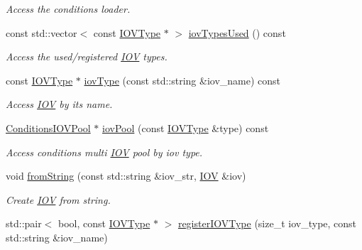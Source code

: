 \begin{DoxyCompactItemize}
\begin{DoxyCompactList}\small\item\em Access the conditions loader. \item\end{DoxyCompactList}\item 
const std::vector$<$ const \hyperlink{class_d_d4hep_1_1_i_o_v_type}{IOVType} $\ast$ $>$ \hyperlink{class_d_d4hep_1_1_conditions_1_1_conditions_manager_a01a57795e2d1ae0fba2f2f6348be5c46}{iovTypesUsed} () const 
\begin{DoxyCompactList}\small\item\em Access the used/registered \hyperlink{class_d_d4hep_1_1_i_o_v}{IOV} types. \item\end{DoxyCompactList}\item 
const \hyperlink{class_d_d4hep_1_1_i_o_v_type}{IOVType} $\ast$ \hyperlink{class_d_d4hep_1_1_conditions_1_1_conditions_manager_a1482fa5ace044df693684d705c4e5442}{iovType} (const std::string \&iov\_\-name) const 
\begin{DoxyCompactList}\small\item\em Access \hyperlink{class_d_d4hep_1_1_i_o_v}{IOV} by its name. \item\end{DoxyCompactList}\item 
\hyperlink{class_d_d4hep_1_1_conditions_1_1_conditions_i_o_v_pool}{ConditionsIOVPool} $\ast$ \hyperlink{class_d_d4hep_1_1_conditions_1_1_conditions_manager_a41334f9fe7baf8250249afcf5b19db20}{iovPool} (const \hyperlink{class_d_d4hep_1_1_i_o_v_type}{IOVType} \&type) const 
\begin{DoxyCompactList}\small\item\em Access conditions multi \hyperlink{class_d_d4hep_1_1_i_o_v}{IOV} pool by iov type. \item\end{DoxyCompactList}\item 
void \hyperlink{class_d_d4hep_1_1_conditions_1_1_conditions_manager_aeb9918f7ba860061d6839628ae829447}{fromString} (const std::string \&iov\_\-str, \hyperlink{class_d_d4hep_1_1_i_o_v}{IOV} \&iov)
\begin{DoxyCompactList}\small\item\em Create \hyperlink{class_d_d4hep_1_1_i_o_v}{IOV} from string. \item\end{DoxyCompactList}\item 
std::pair$<$ bool, const \hyperlink{class_d_d4hep_1_1_i_o_v_type}{IOVType} $\ast$ $>$ \hyperlink{class_d_d4hep_1_1_conditions_1_1_conditions_manager_a38ac3f64d572460cd8173ed386550330}{registerIOVType} (size\_\-t iov\_\-type, const std::string \&iov\_\-name)

\end{DoxyCompactItemize}
